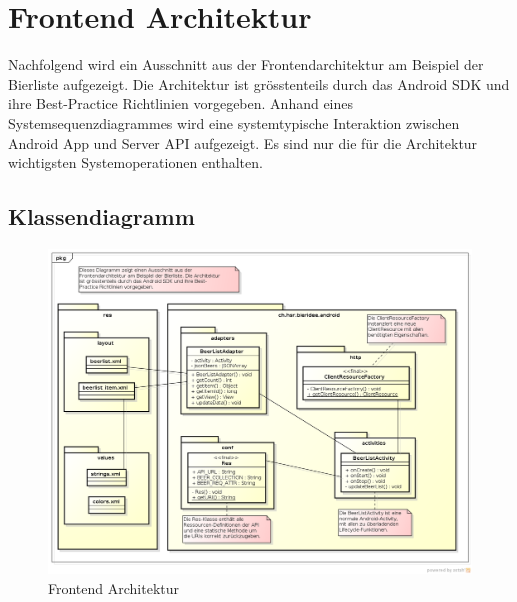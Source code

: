 \documentclass[10pt,a4paper]{scrartcl}
\begin{document}
\newpage

\section{Frontend Architektur}
Nachfolgend wird ein Ausschnitt aus der Frontendarchitektur am Beispiel der Bierliste aufgezeigt.
Die Architektur ist grösstenteils durch das Android SDK und ihre Best-Practice Richtlinien
vorgegeben. Anhand eines Systemsequenzdiagrammes wird eine systemtypische Interaktion zwischen
Android App und Server API aufgezeigt. Es sind nur die für die Architektur wichtigsten
Systemoperationen enthalten.

\subsection{Klassendiagramm}
\begin{figure}[H]
	\includegraphics[height=0.9\textwidth,angle=90]{FrontendArchitektur.png}
	\caption{Frontend Architektur}
	\label{fig:frontend_architecture}
\end{figure}
\end{document}

